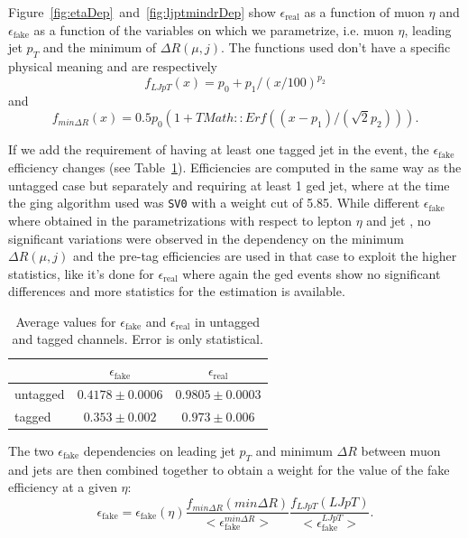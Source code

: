 Figure~\ref{fig:etaDep}~and~\ref{fig:ljptmindrDep}  
show $\epsilon_\mathrm{real}$ as a function of muon $\eta$ 
and  $\epsilon_\mathrm{fake}$ as a function of the variables 
on which we parametrize, i.e. muon $\eta$, leading jet $p_T$ 
and the minimum of $\Delta R(\mu,j)$.  The functions used don't 
have a specific physical meaning and are respectively 
\begin{equation}\label{eq:paruntagljpt}
f_{LJpT}(x) = p_0 + p_1/(x/100)^{p_2}
\end{equation} and 
\begin{equation}\label{eq:parmindr}
f_{min\Delta R}(x) = 0.5 p_0 (1+TMath::Erf( (x-p_1)/(\sqrt{2}p_2))).
\end{equation} 

If we add the requirement of having at least one tagged jet in 
the event, the $\epsilon_\mathrm{fake}$ efficiency changes (see Table~\ref{tab:averageeffs}). 
Efficiencies are computed in the same way as the untagged case 
but separately and requiring at least 1 \btag ged jet, where at the
time the \btag ging algorithm used was \texttt{SV0} with a weight cut 
of 5.85. While different $\epsilon_\mathrm{fake}$ where obtained in the
parametrizations with respect to lepton $\eta$ and jet \pt, 
no significant variations were observed in the dependency on
the minimum $\Delta R(\mu,j)$ and the pre-tag efficiencies are 
used in that case to exploit the higher statistics, like it's done for 
$\epsilon_\mathrm{real}$ where again the \btag ged events show 
no significant differences and more statistics 
for the estimation is available.

\begin{table}\centering
\begin{tabular}{l c c }
\toprule
 & $\epsilon_\mathrm{fake}$ &  $\epsilon_\mathrm{real}$  \\\midrule
untagged & $0.4178 \pm 0.0006 $ & $ 0.9805 \pm 0.0003 $ \\
tagged   & $0.353  \pm 0.002 $ & $ 0.973 \pm 0.006 $ \\\bottomrule
\end{tabular}\caption{Average values for $\epsilon_\mathrm{fake}$ and  $\epsilon_\mathrm{real}$ in untagged and tagged channels. Error is only statistical.}\label{tab:averageeffs}
\end{table} 

The two $\epsilon_\mathrm{fake}$ dependencies on  
leading jet $p_T$ and minimum $\Delta R$ between muon and 
jets  are then combined together to obtain a weight for the value of 
the fake efficiency at a given $\eta$:
\begin{equation}
\epsilon_\mathrm{fake} = \epsilon_\mathrm{fake}(\eta) \dfrac{f_{min\Delta R}(min\Delta R)}{<\epsilon_\mathrm{fake}^{min\Delta R}>}\dfrac{f_{LJpT}(LJpT)}{<\epsilon_\mathrm{fake}^{LJpT}>}.
\end{equation}

